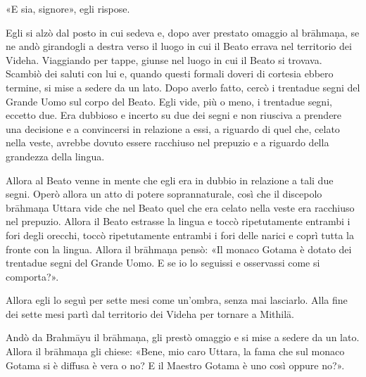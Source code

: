 «E sia, signore», egli rispose.

Egli si alzò dal posto in cui sedeva e, dopo aver prestato omaggio al brāhmaṇa,
se ne andò girandogli a destra verso il luogo in cui il Beato errava nel
territorio dei Videha. Viaggiando per tappe, giunse nel luogo in cui il Beato si
trovava. Scambiò dei saluti con lui e, quando questi formali doveri di cortesia
ebbero termine, si mise a sedere da un lato. Dopo averlo fatto, cercò i
trentadue segni del Grande Uomo sul corpo del Beato. Egli vide, più o meno, i
trentadue segni, eccetto due. Era dubbioso e incerto su due dei segni e non
riusciva a prendere una decisione e a convincersi in relazione a essi, a
riguardo di quel che, celato nella veste, avrebbe dovuto essere racchiuso nel
prepuzio e a riguardo della grandezza della lingua.

Allora al Beato venne in mente che egli era in dubbio in relazione a tali due
segni. Operò allora un atto di potere soprannaturale, così che il discepolo
brāhmaṇa Uttara vide che nel Beato quel che era celato nella veste era racchiuso
nel prepuzio. Allora il Beato estrasse la lingua e toccò ripetutamente entrambi
i fori degli orecchi, toccò ripetutamente entrambi i fori delle narici e coprì
tutta la fronte con la lingua. Allora il brāhmaṇa pensò: «Il monaco Gotama è
dotato dei trentadue segni del Grande Uomo. E se io lo seguissi e osservassi
come si comporta?».

Allora egli lo seguì per sette mesi come un’ombra, senza mai lasciarlo. Alla
fine dei sette mesi partì dal territorio dei Videha per tornare a Mithilā.

Andò da Brahmāyu il brāhmaṇa, gli prestò omaggio e si mise a sedere da un lato.
Allora il brāhmaṇa gli chiese: «Bene, mio caro Uttara, la fama che sul monaco
Gotama si è diffusa è vera o no? E il Maestro Gotama è uno così oppure no?».

